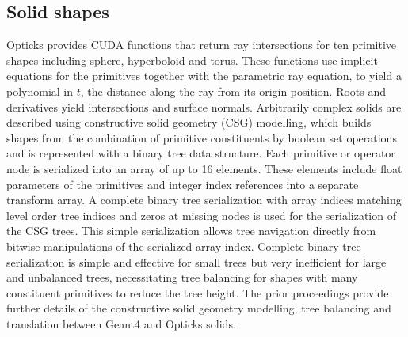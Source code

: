 \documentclass{webofc}
\begin{document}
\subsection{Solid shapes}%
%
Opticks provides CUDA functions that return ray intersections for ten primitive shapes including sphere, hyperboloid and torus.
These functions use implicit equations for the primitives together with 
the parametric ray equation, to yield a polynomial in $t$, the distance along the ray from its origin position. 
Roots and derivatives yield intersections and surface normals.
%
Arbitrarily complex solids are described using constructive solid geometry (CSG) modelling, 
which builds shapes from the combination of primitive constituents by boolean set operations
and is represented with a binary tree data structure.
%
%
%
Each primitive or operator node is serialized into an array of up to 16 elements. 
These elements include float parameters of the primitives and integer index references 
into a separate transform array. 
A complete binary tree serialization with array indices matching level order tree indices
and zeros at missing nodes is used for the serialization of the CSG trees. This simple 
serialization allows tree navigation directly from bitwise manipulations of the serialized array index.
%
Complete binary tree serialization is simple and effective for small trees but very inefficient 
for large and unbalanced trees, necessitating tree balancing for shapes with many constituent primitives 
to reduce the tree height. 
The prior proceedings\cite{chep2018} provide further details of the constructive solid geometry modelling, 
tree balancing and translation between Geant4 and Opticks solids.
\end{document}
